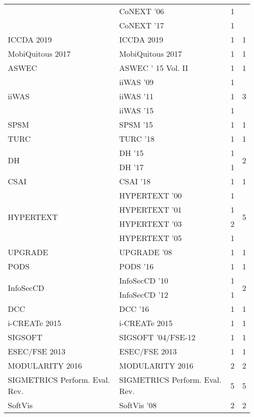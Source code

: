 \begin{table*}[t]
\begin{tabular}{llrr}
& CoNEXT '06 & 1 &\\
& CoNEXT '17 & 1 &\\
\multirow{1}{*}{ICCDA 2019} & ICCDA 2019 & 1 & \multirow{1}{*}{1}\\
\multirow{1}{*}{MobiQuitous 2017} & MobiQuitous 2017 & 1 & \multirow{1}{*}{1}\\
\multirow{1}{*}{ASWEC } & ASWEC ' 15 Vol. II & 1 & \multirow{1}{*}{1}\\
\multirow{3}{*}{iiWAS } & iiWAS '09 & 1 & \multirow{3}{*}{3}\\
& iiWAS '11 & 1 &\\
& iiWAS '15 & 1 &\\
\multirow{1}{*}{SPSM } & SPSM '15 & 1 & \multirow{1}{*}{1}\\
\multirow{1}{*}{TURC } & TURC '18 & 1 & \multirow{1}{*}{1}\\
\multirow{2}{*}{DH } & DH '15 & 1 & \multirow{2}{*}{2}\\
& DH '17 & 1 &\\
\multirow{1}{*}{CSAI } & CSAI '18 & 1 & \multirow{1}{*}{1}\\
\multirow{4}{*}{HYPERTEXT } & HYPERTEXT '00 & 1 & \multirow{4}{*}{5}\\
& HYPERTEXT '01 & 1 &\\
& HYPERTEXT '03 & 2 &\\
& HYPERTEXT '05 & 1 &\\
\multirow{1}{*}{UPGRADE } & UPGRADE '08 & 1 & \multirow{1}{*}{1}\\
\multirow{1}{*}{PODS } & PODS '16 & 1 & \multirow{1}{*}{1}\\
\multirow{2}{*}{InfoSecCD } & InfoSecCD '10 & 1 & \multirow{2}{*}{2}\\
& InfoSecCD '12 & 1 &\\
\multirow{1}{*}{DCC } & DCC '16 & 1 & \multirow{1}{*}{1}\\
\multirow{1}{*}{i-CREATe 2015} & i-CREATe 2015 & 1 & \multirow{1}{*}{1}\\
\multirow{1}{*}{SIGSOFT } & SIGSOFT '04/FSE-12 & 1 & \multirow{1}{*}{1}\\
\multirow{1}{*}{ESEC/FSE 2013} & ESEC/FSE 2013 & 1 & \multirow{1}{*}{1}\\
\multirow{1}{*}{MODULARITY 2016} & MODULARITY 2016 & 2 & \multirow{1}{*}{2}\\
\multirow{1}{*}{SIGMETRICS Perform. Eval. Rev.} & SIGMETRICS Perform. Eval. Rev. & 5 & \multirow{1}{*}{5}\\
\multirow{1}{*}{SoftVis } & SoftVis '08 & 2 & \multirow{1}{*}{2}\\

\end{tabular}
\end{table*}
